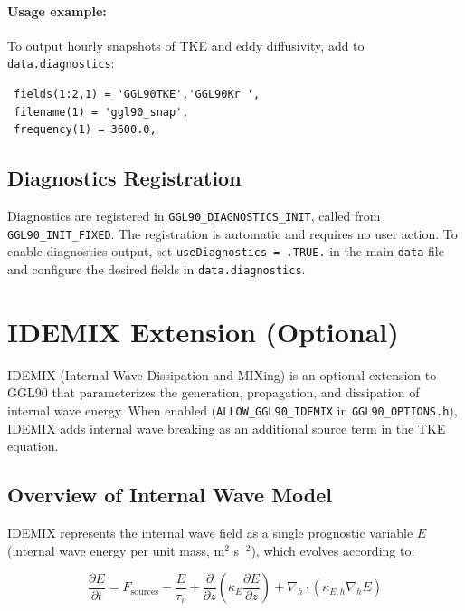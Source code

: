 \documentclass[12pt,letterpaper]{article}
\begin{document}
\paragraph{Usage example:} To output hourly snapshots of TKE and eddy diffusivity, add to \verb|data.diagnostics|:

\begin{verbatim}
 fields(1:2,1) = 'GGL90TKE','GGL90Kr ',
 filename(1) = 'ggl90_snap',
 frequency(1) = 3600.0,
\end{verbatim}

\subsection{Diagnostics Registration}
\label{sec:diag_registration}

Diagnostics are registered in \verb|GGL90_DIAGNOSTICS_INIT|, called from \verb|GGL90_INIT_FIXED|. The registration is automatic and requires no user action. To enable diagnostics output, set \verb|useDiagnostics = .TRUE.| in the main \verb|data| file and configure the desired fields in \verb|data.diagnostics|.

\section{IDEMIX Extension (Optional)}
\label{sec:idemix}

IDEMIX (Internal Wave Dissipation and MIXing) is an optional extension to GGL90 that parameterizes the generation, propagation, and dissipation of internal wave energy. When enabled (\verb|ALLOW_GGL90_IDEMIX| in \verb|GGL90_OPTIONS.h|), IDEMIX adds internal wave breaking as an additional source term in the TKE equation.

\subsection{Overview of Internal Wave Model}

IDEMIX represents the internal wave field as a single prognostic variable $E$ (internal wave energy per unit mass, m$^2$ s$^{-2}$), which evolves according to:

\begin{equation}
\frac{\partial E}{\partial t} = F_{\text{sources}} - \frac{E}{\tau_v} + \frac{\partial}{\partial z}\left(\kappa_E \frac{\partial E}{\partial z}\right) + \nabla_h \cdot (\kappa_{E,h} \nabla_h E)
\end{equation}
\end{document}
